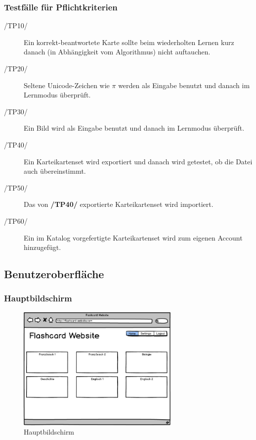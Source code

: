 \subsubsection{Testfälle für Pflichtkriterien}
\begin{description}
	\item[/TP10/] Ein korrekt-beantwortete Karte sollte beim wiederholten Lernen kurz danach (in Abhängigkeit vom Algorithmus) nicht auftauchen.
	\item[/TP20/] Seltene Unicode-Zeichen wie \(\pi\) werden als Eingabe benutzt und danach im Lernmodus überprüft.
	\item[/TP30/] Ein Bild wird als Eingabe benutzt und danach im Lernmodus überprüft.
	\item[/TP40/] Ein Karteikartenset wird exportiert und danach wird getestet, ob die Datei auch übereinstimmt.
	\item[/TP50/] Das von \textbf{/TP40/} exportierte Karteikartenset wird importiert.
	\item[/TP60/] Ein im Katalog vorgefertigte Karteikartenset wird zum eigenen Account hinzugefügt.
\end{description}

\subsection{Benutzeroberfläche}
\subsubsection{Hauptbildschirm}

\begin{figure}[H]
    \centering
    \includegraphics[width=0.7\textwidth]{images/Overview.png}
    \caption{Hauptbildschirm}
    \label{fig:overview}
\end{figure}

